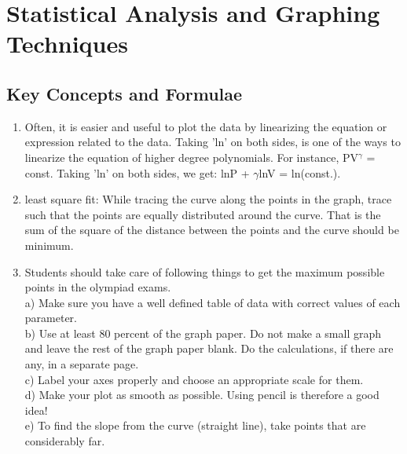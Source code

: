 \chapter{Statistical Analysis and Graphing Techniques}
\pagestyle{fancy}
\fancyhf{}
\fancyhead[OC]{\leftmark}
\fancyhead[EC]{\rightmark}
\cfoot{\thepage}

\section{Key Concepts and Formulae}
\begin{enumerate}
    \item Often, it is easier and useful to plot the data by linearizing the equation or expression related to the data. Taking 'ln' on both sides, is one of the ways to linearize the equation of higher degree polynomials. For instance, PV$^\gamma$ = const. Taking 'ln' on both sides, we get: lnP + $\gamma$lnV = ln(const.). 
    \item least square fit: While tracing the curve along the points in the graph, trace such that the points are equally distributed around the curve. That is the sum of the square of the distance between the points and the curve should be minimum. 
    \item Students should take care of following things to get the maximum possible points in the olympiad exams.\\
    a) Make sure you have a well defined table of data with correct values of each parameter. \\
    b) Use at least 80 percent of the graph paper. Do not make a small graph and leave the rest of the graph paper blank. Do the calculations, if there are any, in a separate page. \\
    c) Label your axes properly and choose an appropriate scale for them.\\
    d) Make your plot as smooth as possible. Using pencil is therefore a good idea!\\
    e) To find the slope from the curve (straight line), take points that are considerably far. 
\end{enumerate}
